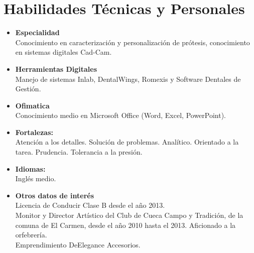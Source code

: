 \documentclass[11pt,a4paper,roman]{moderncv}        %
\begin{document}
\section{Habilidades Técnicas y Personales}
\vspace{3pt}
\begin{itemize}

\item \textbf{Especialidad} \\Conocimiento en caracterización y personalización de prótesis, conocimiento en sistemas digitales Cad-Cam.
\vspace{3pt}
\item \textbf{Herramientas Digitales}\\ Manejo de sistemas Inlab, DentalWings, Romexis y Software Dentales de Gestión.
\vspace{3pt}
\item \textbf{Ofimatica} \\Conocimiento medio en Microsoft Office (Word, Excel, PowerPoint).
\vspace{3pt}
\item \textbf{Fortalezas:} \\Atención a los detalles. Solución de problemas. Analítico. Orientado a la tarea. Prudencia. Tolerancia a la presión.
\vspace{3pt}
\item \textbf{Idiomas:} \\Inglés medio.
\vspace{3pt}
\item \textbf{Otros datos de interés } \\ Licencia de Conducir Clase B desde el año 2013. \\Monitor y Director Artístico del Club de Cueca Campo y Tradición, de la comuna de El Carmen, desde el año 2010 hasta el 2013.
Aficionado a la orfebrería. \\ Emprendimiento DeElegance Accesorios.
\end{itemize}

\nocite{*}


\end{document}

